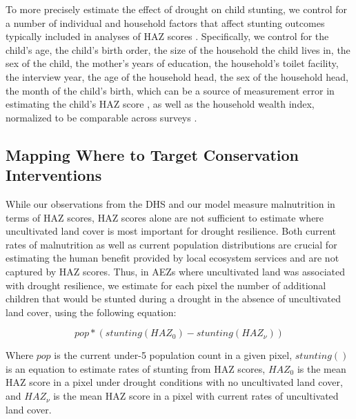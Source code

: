 \documentclass[titlepage]{article}
\begin{document}
To more precisely estimate the effect of drought on child stunting, we control for a number of individual and household factors that affect stunting outcomes typically included in analyses of HAZ scores \citep{brown2020empirical}.  Specifically, we control for the child's age, the child's birth order, the size of the household the child lives in, the sex of the child, the mother's years of education, the household's toilet facility, the interview year, the age of the household head, the sex of the household head, the month of the child's birth, which can be a source of measurement error in estimating the child's HAZ score \citep{larsen2019misreporting}, as well as the household wealth index, normalized to be comparable across surveys \citep{Rutstein2014c}.

\subsection{Mapping Where to Target Conservation Interventions}
While our observations from the DHS and our model measure malnutrition in terms of HAZ scores, HAZ scores alone are not sufficient to estimate where uncultivated land cover is most important for drought resilience.  Both current rates of malnutrition as well as current population distributions are crucial for estimating the human benefit provided by local ecosystem services and are not captured by HAZ scores.  Thus, in AEZs where uncultivated land was associated with drought resilience, we estimate for each pixel the number of additional children that would be stunted during a drought in the absence of uncultivated land cover, using the following equation:

\begin{equation}
  pop * (stunting(HAZ_{0}) - stunting(HAZ_{\nu})) \label{eqn:stunting}
\end{equation}

Where $pop$ is the current under-5 population count in a given pixel, $stunting()$ is an equation to estimate rates of stunting from HAZ scores, $HAZ_{0}$ is the mean HAZ score in a pixel under drought conditions with no uncultivated land cover, and $HAZ_{\nu}$ is the mean HAZ score in a pixel with current rates of uncultivated land cover.
\end{document}
